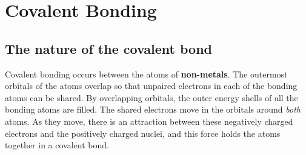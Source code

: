



\section{Covalent Bonding}
\label{subsec:bonding:covalent}

\subsection{The nature of the covalent bond}

Covalent bonding occurs between the atoms of \textbf{non-metals}. The outermost orbitals of the atoms overlap so that unpaired electrons in each of the bonding atoms can be shared. By overlapping orbitals, the outer energy shells of all the bonding atoms are filled. The shared electrons move in the orbitals around \textit{both} atoms. As they move, there is an attraction between these negatively charged electrons and the positively charged nuclei, and this force holds the atoms together in a covalent bond. 


